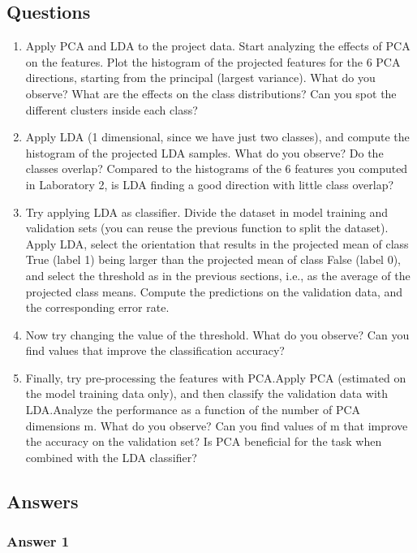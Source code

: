 \documentclass[a4paper, 12pt, english]{article}
\begin{document}
    \subsection{Questions}
    \begin{enumerate}
        \item Apply PCA and LDA to the project data. Start analyzing the effects of PCA on the features. Plot the histogram of the projected features for the 6 PCA directions, starting from the principal (largest variance). What do you observe? What are the effects on the class distributions? Can you spot the different clusters inside each class?
        \item Apply LDA (1 dimensional, since we have just two classes), and compute the histogram of the projected LDA samples. What do you observe? Do the classes overlap? Compared to the histograms of the 6 features you computed in Laboratory 2, is LDA finding a good direction with little class overlap?
        \item Try applying LDA as classifier. Divide the dataset in model training and validation sets (you can reuse the previous function to split the dataset). Apply LDA, select the orientation that results in the projected mean of class True (label 1) being larger than the projected mean of class False (label 0), and select the threshold as in the previous sections, i.e., as the average of the projected class means. Compute the predictions on the validation data, and the corresponding error rate.
        \item Now try changing the value of the threshold. What do you observe? Can you find values that improve the classification accuracy?
        \item Finally, try pre-processing the features with PCA.\@ Apply PCA (estimated on the model training data only), and then classify the validation data with LDA.\@ Analyze the performance as a function of the number of PCA dimensions m. What do you observe? Can you find values of m that improve the accuracy on the validation set? Is PCA beneficial for the task when combined with the LDA classifier?
    \end{enumerate}

    \subsection{Answers}

    \subsubsection{Answer 1}
\end{document}
